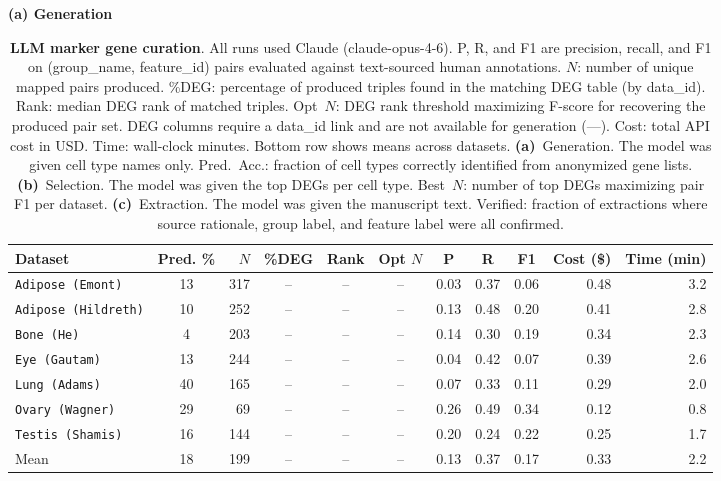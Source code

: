 \documentclass[10pt,twocolumn]{article}
\theoremstyle{plain}
\theoremstyle{definition}
\theoremstyle{remark}
\begin{document}
\begin{table}[ht!]
  \centering
  \caption{\textbf{LLM marker gene curation}. All runs used Claude (claude-opus-4-6). P, R, and F1 are precision, recall, and F1 on (group\_name, feature\_id) pairs evaluated against text-sourced human annotations. \textbf{$N$}: number of unique mapped pairs produced. \%DEG: percentage of produced triples found in the matching DEG table (by data\_id). Rank: median DEG rank of matched triples. Opt~$N$: DEG rank threshold maximizing F-score for recovering the produced pair set. DEG columns require a data\_id link and are not available for generation (---). Cost: total API cost in USD. Time: wall-clock minutes. Bottom row shows means across datasets. \textbf{(a)}~Generation. The model was given cell type names only. Pred.\ Acc.: fraction of cell types correctly identified from anonymized gene lists. \textbf{(b)}~Selection. The model was given the top DEGs per cell type. Best~$N$: number of top DEGs maximizing pair F1 per dataset. \textbf{(c)}~Extraction. The model was given the manuscript text. Verified: fraction of extractions where source rationale, group label, and feature label were all confirmed.}
  \label{tab:llm_curation}%
  \small
  \setlength{\tabcolsep}{4pt}

  \textbf{(a) Generation}
  \vspace{2pt}

  \begin{tabular}{@{}l c r ccc ccc r r@{}}
  \toprule
  Dataset & Pred. \% & $N$ & \%DEG & Rank & Opt $N$ & P & R & F1 & Cost (\$) & Time (min) \\
  \midrule
  \texttt{Adipose (Emont)}    & 13 & 317 & -- & -- & -- & 0.03 & 0.37 & 0.06 & 0.48 & 3.2 \\
  \texttt{Adipose (Hildreth)} & 10 & 252 & -- & -- & -- & 0.13 & 0.48 & 0.20 & 0.41 & 2.8 \\
  \texttt{Bone (He)}          & 4  & 203 & -- & -- & -- & 0.14 & 0.30 & 0.19 & 0.34 & 2.3 \\
  \texttt{Eye (Gautam)}       & 13 & 244 & -- & -- & -- & 0.04 & 0.42 & 0.07 & 0.39 & 2.6 \\
  \texttt{Lung (Adams)}       & 40 & 165 & -- & -- & -- & 0.07 & 0.33 & 0.11 & 0.29 & 2.0 \\
  \texttt{Ovary (Wagner)}     & 29 &  69 & -- & -- & -- & 0.26 & 0.49 & 0.34 & 0.12 & 0.8 \\
  \texttt{Testis (Shamis)}    & 16 & 144 & -- & -- & -- & 0.20 & 0.24 & 0.22 & 0.25 & 1.7 \\
  \midrule
  Mean               & 18 & 199 & -- & -- & -- & 0.13 & 0.37 & 0.17 & 0.33 & 2.2 \\
  \bottomrule
  \end{tabular}



\end{table}
\end{document}
